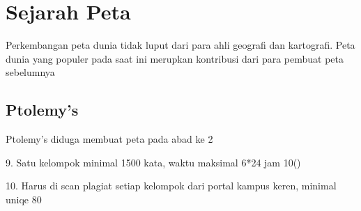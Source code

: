 	\section{Sejarah Peta}
	Perkembangan peta dunia tidak luput dari para ahli geografi dan kartografi. Peta dunia yang populer pada saat ini merupkan kontribusi dari para 
	pembuat peta sebelumnya

	\subsection{Ptolemy's}
	Ptolemy's diduga membuat peta pada abad ke 2
	
9. Satu kelompok minimal 1500 kata, waktu maksimal 6*24 jam 10()

10. Harus di scan plagiat setiap kelompok dari portal kampus keren, minimal uniqe 80%

